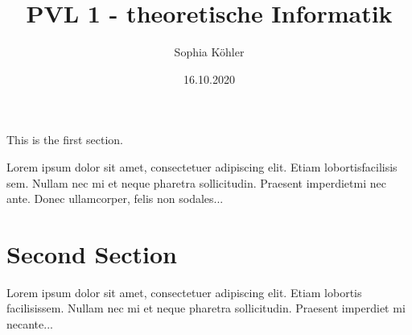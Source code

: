 \documentclass{article}
\title{PVL 1 - theoretische Informatik}
\author{Sophia Köhler}
\date{16.10.2020}
\begin{document}
\maketitle

\section{}
\subsection{}

This is the first section.

Lorem  ipsum  dolor  sit  amet,  consectetuer  adipiscing  
elit.   Etiam  lobortisfacilisis sem.  Nullam nec mi et 
neque pharetra sollicitudin.  Praesent imperdietmi nec ante. 
Donec ullamcorper, felis non sodales...

\section{Second Section}

Lorem ipsum dolor sit amet, consectetuer adipiscing elit.  
Etiam lobortis facilisissem.  Nullam nec mi et neque pharetra 
sollicitudin.  Praesent imperdiet mi necante...
\end{document}
